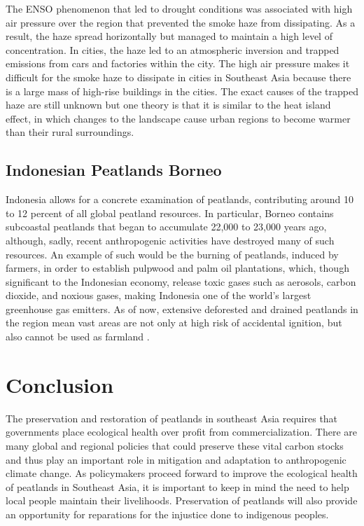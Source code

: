 The ENSO phenomenon that led to drought conditions was associated with high air pressure over the region that prevented the smoke haze from dissipating. As a result, the haze spread horizontally but managed to maintain a high level of concentration. In cities, the haze led to an atmospheric inversion and trapped emissions from cars and factories within the city. The high air pressure makes it difficult for the smoke haze to dissipate in cities in Southeast Asia because there is a large mass of high-rise buildings in the cities. The exact causes of the trapped haze are still unknown but one theory is that it is similar to the heat island effect, in which changes to the landscape cause urban regions to become warmer than their rural surroundings. 

\subsection{Indonesian Peatlands Borneo}

Indonesia allows for a concrete examination of peatlands, contributing around 10 to 12 percent of all global peatland resources. In particular, Borneo contains subcoastal peatlands that began to accumulate 22,000 to 23,000 years ago, although, sadly, recent anthropogenic activities have destroyed many of such resources. An example of such would be the burning of peatlands, induced by farmers, in order to establish pulpwood and palm oil plantations, which, though significant to the Indonesian economy, release toxic gases such as aerosols, carbon dioxide, and noxious gases, making Indonesia one of the world's largest greenhouse gas emitters. As of now, extensive deforested and drained peatlands in the region mean vast areas are not only at high risk of accidental ignition, but also cannot be used as farmland \citep{ballhorn2009derivation}.

\section{Conclusion}

The preservation and restoration of peatlands in southeast Asia requires that governments place ecological health over profit from commercialization. There are many global and regional policies that could preserve these vital carbon stocks and thus play an important role in mitigation and adaptation to anthropogenic climate change. As policymakers proceed forward to improve the ecological health of peatlands in Southeast Asia, it is important to keep in mind the need to help local people maintain their livelihoods. Preservation of peatlands will also provide an opportunity for reparations for the injustice done to indigenous peoples. 

